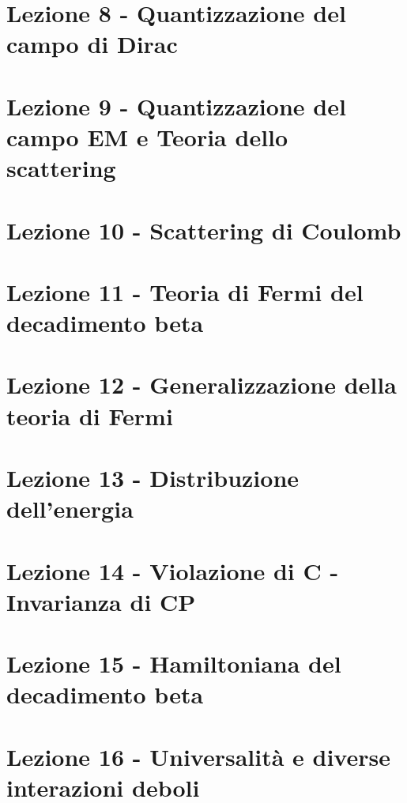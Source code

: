 \documentclass[11pt,a4paper]{book}
\renewcommand{\(}{\left(}
\renewcommand{\)}{\right)}
\begin{document}
\chapter{Lezione 8 - Quantizzazione del campo di Dirac}
\clearpage{\thispagestyle{empty}\cleardoublepage}
\chapter{Lezione 9 - Quantizzazione del campo EM e Teoria dello scattering}
\clearpage{\thispagestyle{empty}\cleardoublepage}
\chapter{Lezione 10 - Scattering di Coulomb}
\clearpage{\thispagestyle{empty}\cleardoublepage}
\chapter{Lezione 11 - Teoria di Fermi del decadimento beta}
\clearpage{\thispagestyle{empty}\cleardoublepage}
\chapter{Lezione 12 - Generalizzazione della teoria di Fermi}
\clearpage{\thispagestyle{empty}\cleardoublepage}
\chapter{Lezione 13 - Distribuzione dell'energia}
\clearpage{\thispagestyle{empty}\cleardoublepage}
\chapter{Lezione 14 - Violazione di C - Invarianza di CP}
\clearpage{\thispagestyle{empty}\cleardoublepage}
\chapter{Lezione 15 - Hamiltoniana del decadimento beta}
\clearpage{\thispagestyle{empty}\cleardoublepage}
\chapter{Lezione 16 - Universalità e diverse interazioni deboli}
\clearpage{\thispagestyle{empty}\cleardoublepage}
\end{document}
